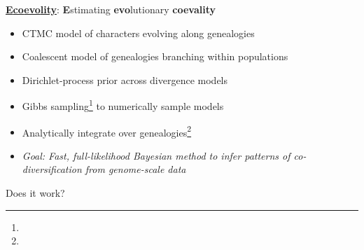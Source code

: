 \begin{frame}
    \begin{center}
        \LARGE
        \href{https://github.com/phyletica/ecoevolity}{
            \textbf{\textcolor{pgreen}{E}\textcolor{pteal}{co\textcolor{pauburn}{evo}lity}}}:
        \textcolor{pgreen}{\bf E}stimating \textcolor{pauburn}{\bf evo}lutionary \textcolor{pteal}{\bf coevality}
    \end{center}

    \begin{itemize}
        \item<2-> CTMC model of characters evolving along genealogies
        \item<2-> Coalescent model of genealogies branching within populations
        \item<2-> Dirichlet-process prior across divergence models
        \item<2-> Gibbs sampling\footnote{\tiny{}}
                  to numerically sample models
        \item<2-> Analytically integrate over genealogies\footnote{\tiny{}}

        \bigskip
        \item<3-> \textsl{Goal: Fast, full-likelihood Bayesian method to infer
                patterns of co-diversification from genome-scale data}
    \end{itemize}
\end{frame}

\begin{frame}
    \begin{center}
        \LARGE
        Does it work?
    \end{center}
\end{frame}

% 



% 




% 

